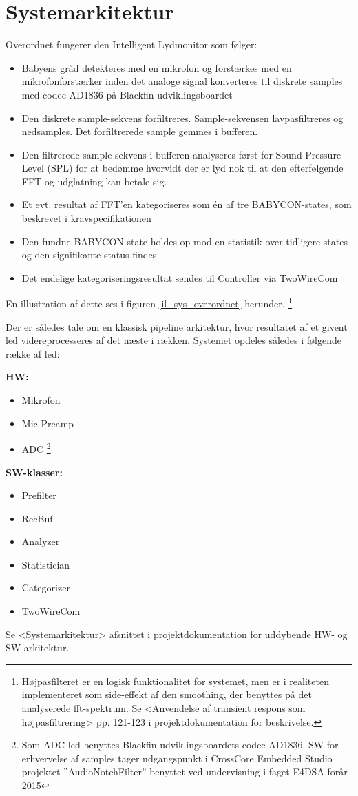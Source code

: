\section{Systemarkitektur}

Overordnet fungerer den Intelligent Lydmonitor som følger:
\begin{itemize}
	\item Babyens gråd detekteres med en mikrofon og forstærkes med en mikrofonforstærker inden det analoge signal konverteres til diskrete samples med codec AD1836 på Blackfin udviklingsboardet
	\item Den diskrete sample-sekvens forfiltreres. Sample-sekvensen lavpasfiltreres og nedsamples. Det forfiltrerede sample gemmes i bufferen.
	\item Den filtrerede sample-sekvens i bufferen analyseres først for Sound Pressure Level (SPL) for at bedømme hvorvidt der er lyd nok til at den efterfølgende FFT og udglatning kan betale sig. 
	\item Et evt. resultat af FFT'en kategoriseres som én af tre BABYCON-states, som beskrevet i kravspecifikationen 
	\item Den fundne BABYCON state holdes op mod en statistik over tidligere states og den signifikante status findes
	\item Det endelige kategoriseringsresultat sendes til Controller via TwoWireCom
\end{itemize}
En illustration af dette ses i figuren \ref{il_sys_overordnet} herunder. \footnote{Højpasfilteret er en logisk funktionalitet for systemet, men er i realiteten implementeret som side-effekt af den smoothing, der benyttes på det analyserede fft-spektrum. Se <Anvendelse af transient respons som højpasfiltrering> pp. 121-123 i projektdokumentation for beskrivelse.}


Der er således tale om en klassisk pipeline arkitektur, hvor resultatet af et givent led videreprocesseres af det næste i rækken.
Systemet opdeles således i følgende række af led:

\textbf{HW:} 
\begin{itemize}
\item Mikrofon
\item Mic Preamp
\item ADC \footnote{Som ADC-led benyttes Blackfin udviklingsboardets codec AD1836. SW for erhvervelse af samples tager udgangspunkt i CrossCore Embedded Studio projektet ''AudioNotchFilter'' benyttet ved undervisning i faget E4DSA forår 2015}
\end{itemize}

\textbf{SW-klasser:} 
\begin{itemize}
\item Prefilter
\item RecBuf
\item Analyzer
\item Statistician
\item Categorizer
\item TwoWireCom
\end{itemize}
Se <Systemarkitektur> afsnittet i projektdokumentation for uddybende HW- og SW-arkitektur.
